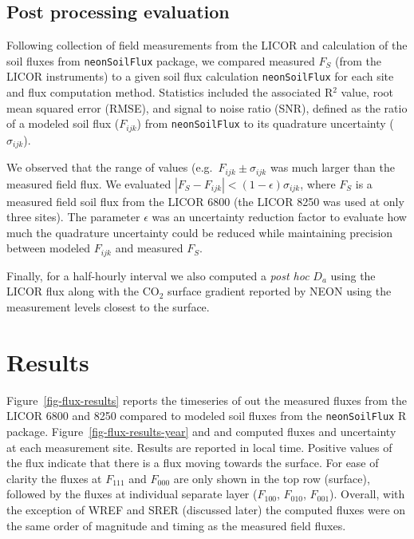 \documentclass[
  letterpaper,
  DIV=11,
  numbers=noendperiod]{scrartcl}
\begin{document}
\subsection{Post processing evaluation}\label{sec-post-process}

Following collection of field measurements from the LICOR and
calculation of the soil fluxes from \texttt{neonSoilFlux} package, we
compared measured \(F_{S}\) (from the LICOR instruments) to a given soil
flux calculation \texttt{neonSoilFlux} for each site and flux
computation method. Statistics included the associated R\(^{2}\) value,
root mean squared error (RMSE), and signal to noise ratio (SNR), defined
as the ratio of a modeled soil flux (\(F_{ijk}\)) from
\texttt{neonSoilFlux} to its quadrature uncertainty (\(\sigma_{ijk}\)).

We observed that the range of values (e.g.~\(F_{ijk} \pm \sigma_{ijk}\)
was much larger than the measured field flux. We evaluated
\(| F_{S} - F_{ijk} | < (1-\epsilon) \sigma_{ijk}\), where \(F_{S}\) is
a measured field soil flux from the LICOR 6800 (the LICOR 8250 was used
at only three sites). The parameter \(\epsilon\) was an uncertainty
reduction factor to evaluate how much the quadrature uncertainty could
be reduced while maintaining precision between modeled \(F_{ijk}\) and
measured \(F_{S}\).

Finally, for a half-hourly interval we also computed a \emph{post hoc}
\(D_{a}\) using the LICOR flux along with the CO\(_{2}\) surface
gradient reported by NEON using the measurement levels closest to the
surface.

\section{Results}\label{results}

Figure~\ref{fig-flux-results} reports the timeseries of out the measured
fluxes from the LICOR 6800 and 8250 compared to modeled soil fluxes from
the \texttt{neonSoilFlux} R package. Figure~\ref{fig-flux-results-year}
and and computed fluxes and uncertainty at each measurement site.
Results are reported in local time. Positive values of the flux indicate
that there is a flux moving towards the surface. For ease of clarity the
fluxes at \(F_{111}\) and \(F_{000}\) are only shown in the top row
(surface), followed by the fluxes at individual separate layer
(\(F_{100}\), \(F_{010}\), \(F_{001}\)). Overall, with the exception of
WREF and SRER (discussed later) the computed fluxes were on the same
order of magnitude and timing as the measured field fluxes.
\end{document}
